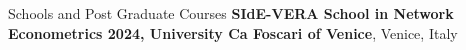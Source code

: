 \begin{rubric}{Schools and Post Graduate Courses}
\entry*[July 2024]%
	\textbf{SIdE-VERA School in Network Econometrics 2024, University Ca Foscari of Venice}, Venice, Italy
\end{rubric}
